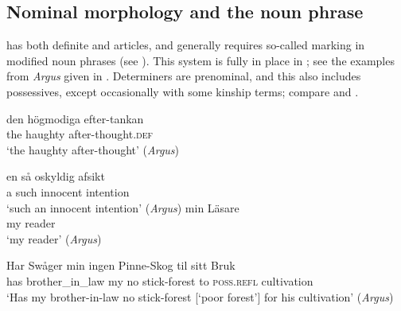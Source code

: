 \documentclass[output=paper]{langscibook}
\begin{document}
\subsection{Nominal morphology and the noun phrase}\label{sec:intro:3.4}


 has both definite and  articles, and generally requires so-called  marking in modified noun phrases (see \citealt{Julien2005}). This system is fully in place in ; see the examples from \textit{Argus} given in . Determiners are prenominal, and this also includes possessives, except occasionally with some kinship terms; compare  and .


\ea \label{ex:intro:33}
\ea \label{ex:intro:33a}
\gll  den högmodiga     efter-tankan \\
the  haughty   after-thought\textsc{.def}\\
\glt ‘the haughty after-thought’ (\textit{Argus})

\ex \label{ex:intro:33b}
\gll en så     oskyldig   afsikt\\
    a   such  innocent   intention\\
\glt `such an innocent intention’ (\textit{Argus})
\z
\ex \label{ex:intro:34}
\ea \label{ex:intro:34a}
\gll  min Läsare \\
my   reader \\
\glt        ‘my reader’ (\textit{Argus})

\ex \label{ex:intro:34b}
\gll Har Swåger       min   ingen Pinne-Skog   til sitt       Bruk\\
 has  brother\_in\_law  my  no    stick-forest    to  \textsc{poss.refl}  cultivation\\
\glt        ‘Has my brother-in-law no stick-forest [`poor forest'] for his cultivation’ (\textit{Argus})
\z
\z
\end{document}
